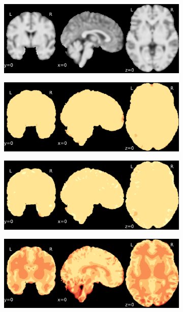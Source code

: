 \documentclass{article}
\begin{document}
\begin{landscape}
\begin{figure}
        \begin{subfigure}[t]{0.2\paperheight}
            \centering
            \includegraphics[width=\textwidth]{figures/ieee_T1/fwhm_5/ieee_ds002338_sub-xp201.pdf}
        \end{subfigure}
        \begin{subfigure}[t]{0.2\paperheight}
            \centering
            \includegraphics[width=\textwidth]{figures/sig/fwhm_5/rr_ds002338_sub-xp201_sig.pdf}
        \end{subfigure}
        \begin{subfigure}[t]{0.2\paperheight}
            \centering
            \includegraphics[width=\textwidth]{figures/sig/fwhm_5/rs_ds002338_sub-xp201_sig.pdf}
        \end{subfigure}
        \begin{subfigure}[t]{0.2\paperheight}
            \centering
            \includegraphics[width=\textwidth]{figures/sig/fwhm_5/rr.rs_ds002338_sub-xp201_sig.pdf}

\end{subfigure}
\end{figure}
\end{landscape}
\end{document}
